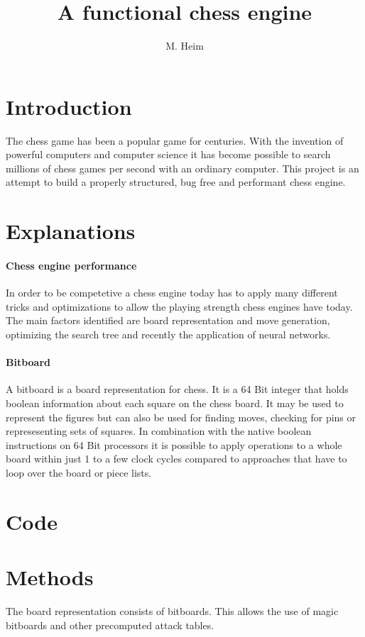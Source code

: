 \documentclass[10p]{report}
\title{A functional chess engine}
\author{M. Heim}
\begin{document}
\maketitle
\section{Introduction}
The chess game has been a popular game for centuries. With the invention of powerful computers and computer science it has become possible to search millions of chess games per second with an ordinary computer. This project is an attempt to build a properly structured, bug free and performant chess engine.

\section{Explanations}
\paragraph{Chess engine performance}
In order to be competetive a chess engine today has to apply many different tricks and optimizations to allow the playing strength chess engines have today. The main factors identified are board representation and move generation, optimizing the search tree and recently the application of neural networks.
\paragraph{Bitboard}
A bitboard is a board representation for chess. It is a 64 Bit integer that holds boolean information about each square on the chess board. It may be used to represent the figures but can also be used for finding moves, checking for pins or represesenting sets of squares. In combination with the native boolean instructions on 64 Bit processors it is possible to apply operations to a whole board within just 1 to a few clock cycles compared to approaches that have to loop over the board or piece lists.

\section{Code}

\section{Methods}
The board representation consists of bitboards. This allows the use of magic bitboards and other precomputed attack tables. 
\end{document}
